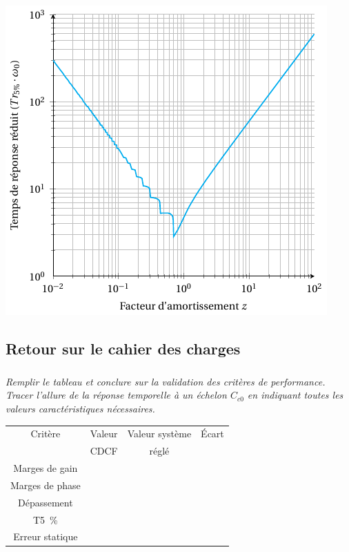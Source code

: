 \documentclass[10pt,fleqn]{article} %
\begin{document}
\begin{multicols}{2}
\begin{center}
\includegraphics[width=\linewidth]{images/abaque_tr}
\end{center}

\fi

\subsection*{Retour sur le cahier des charges}
\subparagraph{}
\textit{Remplir le tableau et conclure sur la validation des critères de performance.
Tracer l’allure de la réponse temporelle à un échelon $C_{c0}$ en indiquant toutes les valeurs caractéristiques nécessaires.}

\footnotesize
\begin{center}
\begin{tabular}{|c|c|c|c|}
\hline
Critère & Valeur & Valeur système & Écart \\ 
 &  CDCF & réglé &  \\ \hline
Marges de gain &  &&\\ \hline
Marges de phase &  &&\\ \hline
Dépassement &  &&\\ \hline
T5~\% & && \\ \hline
Erreur statique &&& \\ \hline
\end{tabular}
\end{center}
\normalsize 


\end{multicols}
\end{document}
